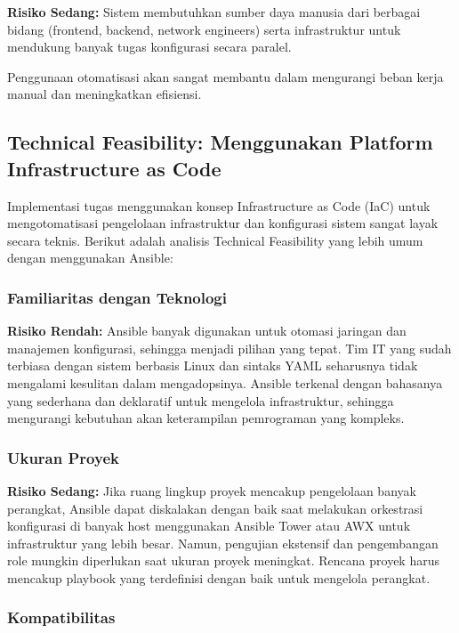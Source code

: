 \textbf{Risiko Sedang:} Sistem membutuhkan sumber daya manusia dari berbagai bidang (frontend, backend, network engineers) serta infrastruktur untuk mendukung banyak tugas konfigurasi secara paralel.

Penggunaan otomatisasi akan sangat membantu dalam mengurangi beban kerja manual dan meningkatkan efisiensi.


\subsection{Technical Feasibility: Menggunakan Platform Infrastructure as Code}

Implementasi tugas menggunakan konsep Infrastructure as Code (IaC) untuk mengotomatisasi pengelolaan infrastruktur dan konfigurasi sistem sangat layak secara teknis. Berikut adalah analisis Technical Feasibility yang lebih umum dengan menggunakan Ansible:

\subsubsection{Familiaritas dengan Teknologi}

\textbf{Risiko Rendah:} Ansible banyak digunakan untuk otomasi jaringan dan manajemen konfigurasi, sehingga menjadi pilihan yang tepat. Tim IT yang sudah terbiasa dengan sistem berbasis Linux dan sintaks YAML seharusnya tidak mengalami kesulitan dalam mengadopsinya. Ansible terkenal dengan bahasanya yang sederhana dan deklaratif untuk mengelola infrastruktur, sehingga mengurangi kebutuhan akan keterampilan pemrograman yang kompleks.

\subsubsection{Ukuran Proyek}

\textbf{Risiko Sedang:} Jika ruang lingkup proyek mencakup pengelolaan banyak perangkat, Ansible dapat diskalakan dengan baik saat melakukan orkestrasi konfigurasi di banyak host menggunakan Ansible Tower atau AWX untuk infrastruktur yang lebih besar. Namun, pengujian ekstensif dan pengembangan role mungkin diperlukan saat ukuran proyek meningkat. Rencana proyek harus mencakup playbook yang terdefinisi dengan baik untuk mengelola perangkat.

\subsubsection{Kompatibilitas}

